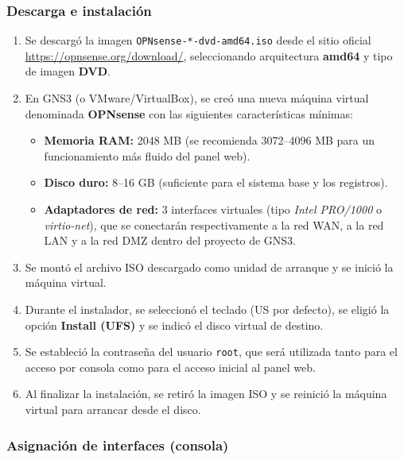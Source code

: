\documentclass{article}
\providecommand{\tightlist}{%
  \setlength{\itemsep}{0pt}\setlength{\parskip}{0pt}}
\renewcommand{\_}{\oldunderscore\hskip0pt\relax}
\begin{document}
\hypertarget{descarga-e-instalaciuxf3n}{%
\subsubsection{Descarga e instalación}\label{descarga-e-instalaciuxf3n}}

\begin{enumerate}
\def\labelenumi{\arabic{enumi}.}
\tightlist
\item
  Se descargó la imagen \texttt{OPNsense-*-dvd-amd64.iso} desde el sitio
  oficial \url{https://opnsense.org/download/}, seleccionando
  arquitectura \textbf{amd64} y tipo de imagen \textbf{DVD}.
\item
  En GNS3 (o VMware/VirtualBox), se creó una nueva máquina virtual
  denominada \textbf{OPNsense} con las siguientes características
  mínimas:

  \begin{itemize}
  \tightlist
  \item
    \textbf{Memoria RAM:} 2048 MB (se recomienda 3072--4096 MB para un
    funcionamiento más fluido del panel web).
  \item
    \textbf{Disco duro:} 8--16 GB (suficiente para el sistema base y los
    registros).
  \item
    \textbf{Adaptadores de red:} 3 interfaces virtuales (tipo
    \emph{Intel PRO/1000} o \emph{virtio-net}), que se conectarán
    respectivamente a la red WAN, a la red LAN y a la red DMZ dentro del
    proyecto de GNS3.
  \end{itemize}
\item
  Se montó el archivo ISO descargado como unidad de arranque y se inició
  la máquina virtual.
\item
  Durante el instalador, se seleccionó el teclado (US por defecto), se
  eligió la opción \textbf{Install (UFS)} y se indicó el disco virtual
  de destino.
\item
  Se estableció la contraseña del usuario \texttt{root}, que será
  utilizada tanto para el acceso por consola como para el acceso inicial
  al panel web.
\item
  Al finalizar la instalación, se retiró la imagen ISO y se reinició la
  máquina virtual para arrancar desde el disco.
\end{enumerate}

\hypertarget{asignaciuxf3n-de-interfaces-consola}{%
\subsubsection{Asignación de interfaces
(consola)}\label{asignaciuxf3n-de-interfaces-consola}}
\end{document}
